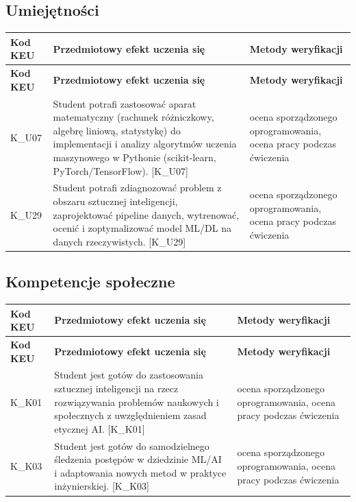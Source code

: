 \documentclass[12pt, a4paper]{article}
\newcommand{\thdrule}{\noalign{\global\setlength{\extrarowheight}{0pt}}}
\newcommand{\thdend}{\noalign{\global\setlength{\extrarowheight}{3pt}}}
\begin{document}
\subsection*{Umiejętności}
{\scriptsize
\begin{longtable}{m{1.6cm}m{9.0cm}m{4.2cm}}
\thdrule\toprule
\rowcolor{pjatkRed} {\color{white}\footnotesize\textbf{\vphantom{Ag}Kod KEU}} & {\color{white}\footnotesize\textbf{\vphantom{Ag}Przedmiotowy efekt uczenia się}} & {\color{white}\footnotesize\textbf{\vphantom{Ag}Metody weryfikacji}} \\
\midrule\thdend
\endfirsthead
\thdrule\toprule
\rowcolor{pjatkRed} {\color{white}\footnotesize\textbf{\vphantom{Ag}Kod KEU}} & {\color{white}\footnotesize\textbf{\vphantom{Ag}Przedmiotowy efekt uczenia się}} & {\color{white}\footnotesize\textbf{\vphantom{Ag}Metody weryfikacji}} \\
\midrule\thdend
\endhead
  \rowcolor{tableRowLight} K\_U07 & Student potrafi zastosować aparat matematyczny (rachunek różniczkowy, algebrę liniową, statystykę) do implementacji i analizy algorytmów uczenia maszynowego w Pythonie (scikit-learn, PyTorch/TensorFlow). {[}K\_U07{]} & ocena sporządzonego oprogramowania, ocena pracy podczas ćwiczenia \\
  \rowcolor{tableRowAlt} K\_U29 & Student potrafi zdiagnozować problem z obszaru sztucznej inteligencji, zaprojektować pipeline danych, wytrenować, ocenić i zoptymalizować model ML/DL na danych rzeczywistych. {[}K\_U29{]} & ocena sporządzonego oprogramowania, ocena pracy podczas ćwiczenia \\
\bottomrule
\end{longtable}}

\subsection*{Kompetencje społeczne}
{\scriptsize
\begin{longtable}{m{1.6cm}m{9.0cm}m{4.2cm}}
\thdrule\toprule
\rowcolor{pjatkRed} {\color{white}\footnotesize\textbf{\vphantom{Ag}Kod KEU}} & {\color{white}\footnotesize\textbf{\vphantom{Ag}Przedmiotowy efekt uczenia się}} & {\color{white}\footnotesize\textbf{\vphantom{Ag}Metody weryfikacji}} \\
\midrule\thdend
\endfirsthead
\thdrule\toprule
\rowcolor{pjatkRed} {\color{white}\footnotesize\textbf{\vphantom{Ag}Kod KEU}} & {\color{white}\footnotesize\textbf{\vphantom{Ag}Przedmiotowy efekt uczenia się}} & {\color{white}\footnotesize\textbf{\vphantom{Ag}Metody weryfikacji}} \\
\midrule\thdend
\endhead
  \rowcolor{tableRowLight} K\_K01 & Student jest gotów do zastosowania sztucznej inteligencji na rzecz rozwiązywania problemów naukowych i społecznych z uwzględnieniem zasad etycznej AI. {[}K\_K01{]} & ocena sporządzonego oprogramowania, ocena pracy podczas ćwiczenia \\
  \rowcolor{tableRowAlt} K\_K03 & Student jest gotów do samodzielnego śledzenia postępów w dziedzinie ML/AI i adaptowania nowych metod w praktyce inżynierskiej. {[}K\_K03{]} & ocena sporządzonego oprogramowania, ocena pracy podczas ćwiczenia \\
\bottomrule
\end{longtable}}
\end{document}

